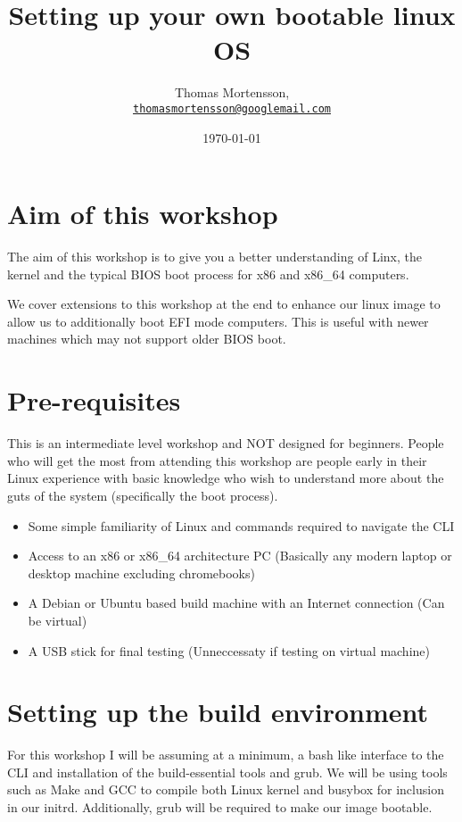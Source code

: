 \documentclass[twocolumn]{article}
\begin{document}
\lstset{style=Style1}

\title{Setting up your own bootable linux OS} 
\author{Thomas Mortensson,\\
		\texttt{\href{mailto:thomasmortensson@googlemail.com}{thomasmortensson@googlemail.com}} 
		}
\date{\today} 
\maketitle

\section{Aim of this workshop}
The aim of this workshop is to give you a better understanding of Linx, the kernel and the typical BIOS boot process for x86 and x86\_64 computers.

We cover extensions to this workshop at the end to enhance our linux image to allow us to additionally boot EFI mode computers. This is useful with newer machines which may not support older BIOS boot.

\section{Pre-requisites}

This is an intermediate level workshop and NOT designed for beginners. People who will get the most from attending this workshop are people early in their Linux experience with basic knowledge who wish to understand more about the guts of the system (specifically the boot process).
\begin{itemize}
	\item Some simple familiarity of Linux and commands required to navigate the CLI
	\item Access to an x86 or x86\_64 architecture PC (Basically any modern laptop or desktop machine excluding chromebooks)
	\item A Debian or Ubuntu based build machine with an Internet connection (Can be virtual)
	\item A USB stick for final testing (Unneccessaty if testing on virtual machine)
\end{itemize}

\section{Setting up the build environment}

For this workshop I will be assuming at a minimum, a bash like interface to the CLI and installation of the build-essential tools and grub. We will be using tools such as Make and GCC to compile both Linux kernel and busybox for inclusion in our initrd. Additionally, grub will be required to make our image bootable.
\end{document}
